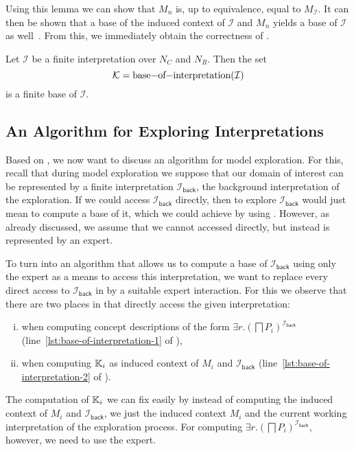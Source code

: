 Using this lemma we can show that $M_{n}$ is, up to equivalence, equal to
$M_{\mathcal{I}}$.  It can then be shown that a base of the induced context of
$\mathcal{I}$ and $M_{n}$ yields a base of $\mathcal{I}$ as
well~\cite[Corollary~5.14]{Diss-Felix}.  From this, we immediately obtain the correctness
of .

\begin{Theorem}
  \label{thm:Felix-6.9}
  Let $\mathcal{I}$ be a finite interpretation over $N_{C}$ and $N_{R}$.  Then the set
  \begin{equation*}
    \mathcal{K} = \text{\lstinline{base-of-interpretation}}(\mathcal{I})
  \end{equation*}
  is a finite base of $\mathcal{I}$.
\end{Theorem}

\subsection{An Algorithm for Exploring Interpretations}
\label{sec:an-algor-expl}

Based on , we now want to discuss an algorithm for model
exploration.  For this, recall that during model exploration we suppose that our domain of
interest can be represented by a finite interpretation $\mathcal{I}_{\mathsf{back}}$, the
background interpretation of the exploration.  If we could access
$\mathcal{I}_{\mathsf{back}}$ directly, then to explore $\mathcal{I}_{\mathsf{back}}$
would just mean to compute a base of it, which we could achieve by using
.  However, as already discussed, we assume that we
cannot accessed directly, but instead is represented by an expert.

To turn  into an algorithm that allows us to compute a
base of $\mathcal{I}_{\mathsf{back}}$ using only the expert as a means to access this
interpretation, we want to replace every direct access to $\mathcal{I}_{\mathsf{back}}$ in
 by a suitable expert interaction.  For this we observe
that there are two places in  that directly access the
given interpretation:
\begin{enumerate}[i. ]
\item when computing concept descriptions of the form $\exists r.(\bigsqcap
  P_{i})^{\mathcal{I}_{\mathsf{back}}}$ (line~\ref{lst:base-of-interpretation-1} of
  ),
\item when computing ${\mathbb{K}}_{i}$ as induced context of $M_{i}$ and
  $\mathcal{I}_{\mathsf{back}}$ (line~\ref{lst:base-of-interpretation-2} of
  ).
\end{enumerate}
The computation of ${\mathbb{K}}_{i}$ we can fix easily by instead of computing the induced
context of $M_{i}$ and $\mathcal{I}_{\mathsf{back}}$, we just the induced context $M_{i}$
and the current working interpretation of the exploration process.  For computing $\exists
r. (\bigsqcap P_{i})^{\mathcal{I}_{\mathsf{back}}}$, however, we need to use the expert.

